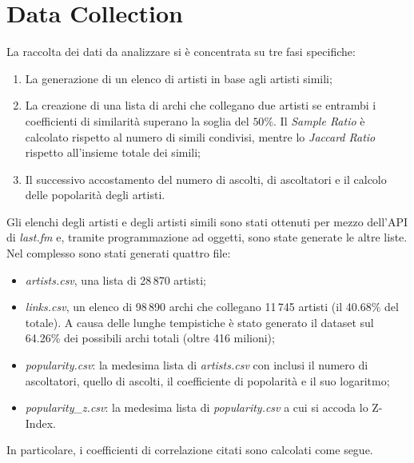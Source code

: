 \documentclass[sigchi]{acmart}
\begin{document}
\section{Data Collection}

La raccolta dei dati da analizzare si è concentrata su tre fasi specifiche:
\begin{enumerate}
\item La generazione di un elenco di artisti in base agli artisti simili;
\item La creazione di una lista di archi che collegano due artisti se entrambi i coefficienti di similarità superano la soglia del $50\%$. Il {\itshape Sample Ratio} è calcolato rispetto al numero di simili condivisi, mentre lo {\itshape Jaccard Ratio} rispetto all'insieme totale dei simili;
\item Il successivo accostamento del numero di ascolti, di ascoltatori e il calcolo delle popolarità degli artisti.
\end{enumerate}
Gli elenchi degli artisti e degli artisti simili sono stati ottenuti per mezzo dell'API di {\itshape last.fm} e, tramite programmazione ad oggetti, sono state generate le altre liste. Nel complesso sono stati generati quattro file:

\begin{itemize}
\item {\itshape artists.csv}, una lista di 28\,870 artisti;
\item {\itshape links.csv}, un elenco di 98\,890 archi che collegano 11\,745 artisti (il 40.68\% del totale). A causa delle lunghe tempistiche è stato generato il dataset sul 64.26\% dei possibili archi totali (oltre 416 milioni);
\item {\itshape popularity.csv}: la medesima lista di {\itshape artists.csv} con inclusi il numero di ascoltatori, quello di ascolti, il coefficiente di popolarità e il suo logaritmo;
\item {\itshape popularity\_z.csv}: la medesima lista di {\itshape popularity.csv} a cui si accoda lo Z-Index.
\end{itemize}

In particolare, i coefficienti di correlazione citati sono calcolati come segue.

\renewcommand{\arraystretch}{1.8}  %
\end{document}
